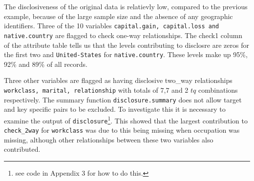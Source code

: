 \documentclass[12pt]{article}
\begin{document}
The disclosiveness of the original data is relatievly low, compared to the previous example, because of the large sample size and the absence of any geographic identifiers. 
Three of the 10 variables \texttt{capital.gain, capital.loss and native.country} are flagged to check one-way relationships. The check1 column of the attribute table tells us that the levels contributing to disclosre are
zeros for the first two and \texttt{United-States} for \texttt{native.country}. These levels make up 95\%, 92\% and 89\% of all records.

Three other variables are flagged as having disclosive two\_way relationships \texttt{workclass, marital, relationship} with totals of 7,7 and 2 $tq$ combinations respectively. The summary function \texttt{disclosure.summary} does not allow target and key specific pairs to be excluded. To
investigate this it is necessary to examine the output of \texttt{disclosure}\footnote{see code in Appendix 3 for how to do this.}. This showed that 
the largest contribution to \texttt{check\_2way} for \texttt{workclass} was due to this being missing when occupation was missing, although other
relationships between these two variables also contributed. 
\end{document}
